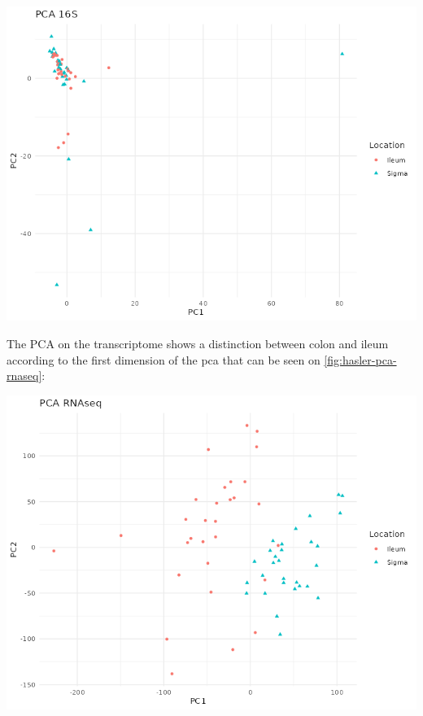 \documentclass[
  12pt,
  a4paper,
  twoside,
  openright]{book}
\let\origfigure\figure
\let\endorigfigure\endfigure
\renewenvironment{figure}[1][2] {
    \expandafter\origfigure\expandafter[!ht]
} {
    \endorigfigure
}
\begin{document}
\begin{figure}
\includegraphics[width=1\linewidth]{images/hasler_PCA_16S} \caption[PCA of 16S of Häsler's dataset.]{PCA of 16S of Häsler's dataset colored by the location of the samples.}\label{fig:hasler-pca-16s}
\end{figure}

The PCA on the transcriptome shows a distinction between colon and ileum according to the first dimension of the pca that can be seen on \ref{fig:hasler-pca-rnaseq}:

\begin{figure}
\includegraphics[width=1\linewidth]{images/hasler_PCA_RNAseq} \caption[PCA of RNAseq of Häsler's dataset.]{PCA of RNAseq of Häsler's dataset. The samples are colored by location sigma and ileum. There are two clear groups according to the location.}\label{fig:hasler-pca-rnaseq}
\end{figure}
\end{document}
